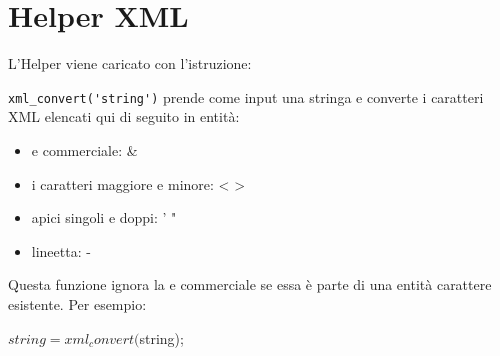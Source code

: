 \section{Helper XML}
\label{helper:xml}

L'Helper viene caricato con l'istruzione:


\verb|xml_convert('string')| prende come input una stringa e converte i caratteri \ac{XML} elencati qui di seguito in entità:

\begin{itemize}
\item e commerciale: &
\item i caratteri maggiore e minore: < >
\item apici singoli e doppi: '  "
\item lineetta: -
\end{itemize}

Questa funzione ignora la e commerciale se essa è parte di una entità carattere esistente. Per esempio:

\begin{code}
$string = xml_convert($string);
\end{code}